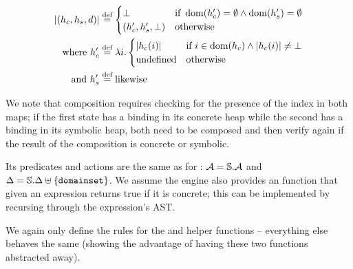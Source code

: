\begin{align*}
	|(h_c, h_s, d)| &\stackrel{\textnormal{def}}= \begin{cases}
		\bot &\text{if}~\operatorname{dom}(h_c')=\emptyset \land \operatorname{dom}(h_s')=\emptyset\\
		(h_c', h_s', \bot) &\text{otherwise}
	\end{cases}\\
	\text{where }h_c'&\stackrel{\textnormal{def}}= \lambda i.\begin{cases}
		|h_c(i)| &\text{if}~ i\in\operatorname{dom}(h_c) \land |h_c(i)| \neq \bot\\
		\text{undefined} &\text{otherwise}
	\end{cases} \\
	\text{and }h_s'&\stackrel{\textnormal{def}}= \text{likewise}
\end{align*}

We note that composition requires checking for the presence of the index in both maps; if the first state has a binding in its concrete heap while the second has a binding in its symbolic heap, both need to be composed and then verify again if the result of the composition is concrete or symbolic.

Its predicates and actions are the same as for \PMap{}: ${\cal{A}} = \mathbb S.{\cal{A}}$ and ${\Delta = \mathbb S.\Delta \uplus \{\texttt{domainset}\}}$. We assume the engine also provides an  function that given an expression returns true if it is concrete; this can be implemented by recursing through the expression's AST.

We again only define the rules for the  and  helper functions -- everything else behaves the same (showing the advantage of having these two functions abstracted away).

